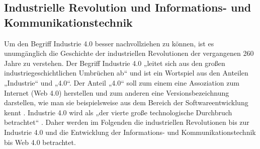 \subsection{Industrielle Revolution und Informations- und Kommunikationstechnik}\label{sec:GeschichteIndustrie4}
Um den Begriff Industrie 4.0 besser nachvollziehen zu können, ist es unumgänglich die Geschichte der industriellen Revolutionen der vergangenen 260 Jahre zu verstehen. Der Begriff Industrie 4.0 „leitet sich aus den großen industriegeschichtlichen Umbrüchen ab“ \cite{7} und ist ein Wortspiel aus den Anteilen „Industrie“ und „4.0“. Der Anteil „4.0“ soll zum einem eine Assoziation zum Internet (Web 4.0) herstellen und zum anderen eine Versionsbezeichnung darstellen, wie man sie beispielsweise aus dem Bereich der Softwareentwicklung kennt \cite{1}.
\newline
Industrie 4.0 wird als „der vierte große technologische Durchbruch betrachtet“ \cite{7}. Daher werden im Folgenden die industriellen Revolutionen bis zur Industrie 4.0 und die Entwicklung der Informations- und Kommunikationstechnik bis Web 4.0 betrachtet.
\newpage

